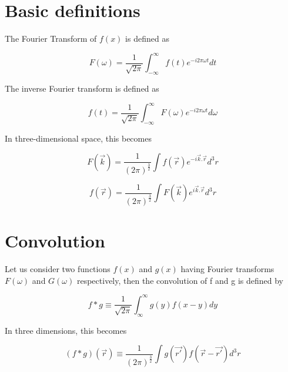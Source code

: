\documentclass[a4,12pt,oneside]{report}
\begin{document}
        \section{Basic definitions}
        
        The Fourier Transform of $f(x)$ is defined as
        
        \begin{equation}
         F(\omega) = \frac{1}{\sqrt{2\pi}}\int_{-\infty}^{\infty} f(t)e^{-i2\pi \omega t} dt
        \end{equation}
        
        The inverse Fourier transform is defined as
        
        \begin{equation}
         f(t) = \frac{1}{\sqrt{2\pi}}\int_{-\infty}^{\infty} F(\omega)e^{-i2\pi \omega t} d\omega
        \end{equation}
        
        In three-dimensional space, this becomes
        
        \begin{equation}
         F(\vec{k}) = \frac{1}{(2\pi)^\frac{3}{2}}\int f(\vec{r})e^{-i\vec{k}.\vec{r}} d^3r
        \end{equation}
        
        \begin{equation}
         f(\vec{r}) = \frac{1}{(2\pi)^\frac{3}{2}}\int F(\vec{k})e^{i\vec{k}.\vec{r}} d^3r
        \end{equation}
        
        \section{Convolution}
        
        Let us consider two functions $f(x)$ and $g(x)$ having Fourier transforms $F(\omega)$ and $G(\omega)$ respectively, then the convolution of f and g is defined by
        
        \begin{equation}
         f \ast g \equiv \frac{1}{\sqrt{2\pi}} \int_\infty^\infty g(y)f(x-y) dy
        \end{equation}
        
        In three dimensions, this becomes
        
        \begin{equation}
         (f \ast g)(\vec{r}) \equiv \frac{1}{(2\pi)^\frac{3}{2}}\int g(\vec{r'})f(\vec{r}-\vec{r'}) d^3r
        \end{equation}
\end{document}
